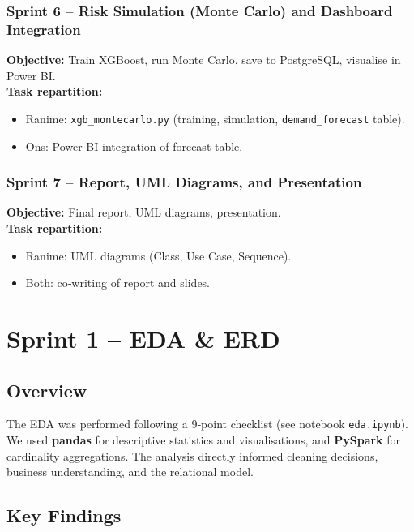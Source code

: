 \documentclass[12pt, a4paper]{report}
\begin{document}
\subsection*{Sprint 6 – Risk Simulation (Monte Carlo) and Dashboard Integration}
\textbf{Objective:} Train XGBoost, run Monte Carlo, save to PostgreSQL, visualise in Power BI. \\
\textbf{Task repartition:}
\begin{itemize}[noitemsep, topsep=0pt]
   \item Ranime: \texttt{xgb\_montecarlo.py} (training, simulation, \texttt{demand\_forecast} table).
   \item Ons: Power BI integration of forecast table.
\end{itemize}

\subsection*{Sprint 7 – Report, UML Diagrams, and Presentation}
\textbf{Objective:} Final report, UML diagrams, presentation. \\
\textbf{Task repartition:}
\begin{itemize}[noitemsep, topsep=0pt]
   \item Ranime: UML diagrams (Class, Use Case, Sequence).
   \item Both: co‑writing of report and slides.
\end{itemize}

\chapter{Sprint 1 – EDA \& ERD}

\section{Overview}
The EDA was performed following a 9‑point checklist (see notebook \texttt{eda.ipynb}). We used \textbf{pandas} for descriptive statistics and visualisations, and \textbf{PySpark} for cardinality aggregations. The analysis directly informed cleaning decisions, business understanding, and the relational model.

\section{Key Findings}
\end{document}
